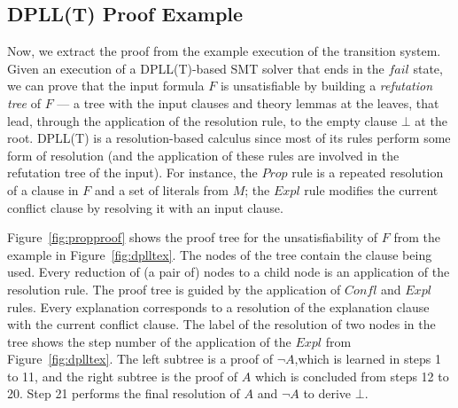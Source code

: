 \documentclass{article}
\begin{document}
	\subsection{DPLL(T) Proof Example}
	\label{sec:proofex}
	Now, we extract the proof from the 
	example execution of the transition system.
	Given an execution of a DPLL(T)-based 
	SMT solver that ends in the $fail$ state, 
	we can prove that the input formula 
	$F$ is unsatisfiable by building a 
	\textit{refutation tree} of $F$ --- a 
	tree with the input clauses 
	and theory lemmas at the leaves, 
	that lead, through the application of 
	the resolution rule, to the empty 
	clause $\bot$ at the root. DPLL(T) is 
	a resolution-based calculus since most 
	of its rules perform some form of 
	resolution (and the application of 
	these rules are involved in the 
	refutation tree of the input). For 
	instance, the $Prop$ rule is a 
	repeated resolution of a clause in 
	$F$ and a set of literals from $M$; 
	the $Expl$ rule modifies the current 
	conflict clause by resolving it with 
	an input clause.
	
	Figure~\ref{fig:propproof} shows the 
	proof tree for the unsatisfiability of 
	$F$ from the example in 
	Figure~\ref{fig:dplltex}. The nodes of 
	the tree contain the clause being 
	used. Every reduction of 
	(a pair of) nodes to a child node 
	is an application of the resolution 
	rule. The proof tree is guided by 
	the application of $Confl$ and $Expl$ 
	rules. Every explanation corresponds 
	to a resolution of the explanation
	clause with the current 
	conflict clause. The label 
	of the resolution of two 
	nodes in the tree shows the 
	step number of the application 
	of the $Expl$ from 
	Figure~\ref{fig:dplltex}.
	The left subtree is a proof of 
	$\neg A$,which is learned in steps 
	1 to 11, and the right subtree is the 
	proof of $A$ which is concluded from 
	steps 12 to 20. Step 21 performs 
	the final resolution of $A$ and 
	$\neg A$ to derive $\bot$.
	
\end{document}
